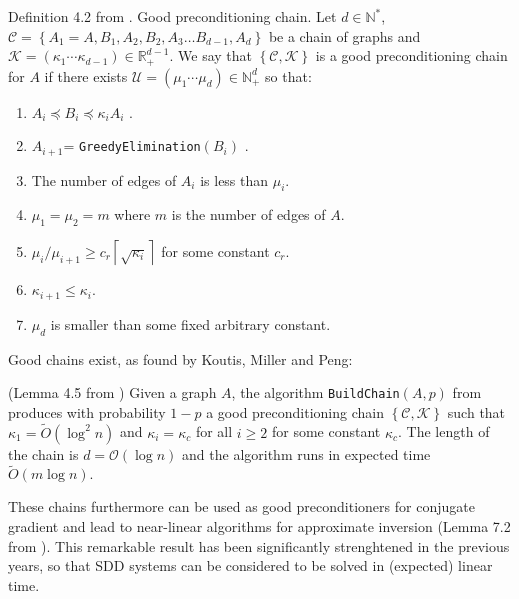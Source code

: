 \begin{definition}
Definition 4.2 from \cite{Koutis2011}. Good preconditioning chain.
Let $d\in\mathbb{N}^{*}$, $\mathcal{C}=\left\{ A_{1}=A,B_{1},A_{2},B_{2},A_{3}\dots B_{d-1},A_{d}\right\} $
be a chain of graphs and $\mathcal{K}=\left(\kappa_{1}\cdots\kappa_{d-1}\right)\in\mathbb{R}_{+}^{d-1}$.
We say that $\left\{ \mathcal{C},\mathcal{K}\right\} $ is a good
preconditioning chain for $A$ if there exists $\mathcal{U}=\left(\mu_{1}\cdots\mu_{d}\right)\in\mathbb{N}_{+}^{d}$
so that: 
\begin{enumerate}
\item $A_{i}\preceq B_{i}\preceq\kappa_{i}A_{i}$ . 
\item $A_{i+1}$= \texttt{GreedyElimination}$\left(B_{i}\right)$ . %

\item The number of edges of $A_{i}$ is less than $\mu_{i}$. 
\item $\mu_{1}=\mu_{2}=m$ where $m$ is the number of edges of $A$. 
\item $\mu_{i}/\mu_{i+1}\geq c_{r}\left\lceil \sqrt{\kappa_{i}}\right\rceil $
for some constant $c_{r}$. 
\item $\kappa_{i+1}\leq\kappa_{i}$. 
\item $\mu_{d}$ is smaller than some fixed arbitrary constant. 
\end{enumerate}
\end{definition}
Good chains exist, as found by Koutis, Miller and Peng:
\begin{lemma}
\label{lem:good-chain} (Lemma 4.5 from \cite{Koutis2011}) Given
a graph $A$, the algorithm \texttt{BuildChain}$\left(A,p\right)$
from \cite{Koutis2011} produces with probability $1-p$ a good preconditioning
chain $\left\{ \mathcal{C},\mathcal{K}\right\} $ such that $\kappa_{1}=\tilde{O}\left(\log^{2}n\right)$
and $\kappa_{i}=\kappa_{c}$ for all $i\geq2$ for some constant $\kappa_{c}$.
The length of the chain is $d=\mathcal{O}\left(\log n\right)$ and
the algorithm runs in expected time $\tilde{O}\left(m\log n\right).$%

\end{lemma}
These chains furthermore can be used as good preconditioners for conjugate
gradient and lead to near-linear algorithms for approximate inversion
(Lemma 7.2 from \cite{Koutis2010}). This remarkable result has been
significantly strenghtened in the previous years, so that SDD systems
can be considered to be solved in (expected) linear time.
